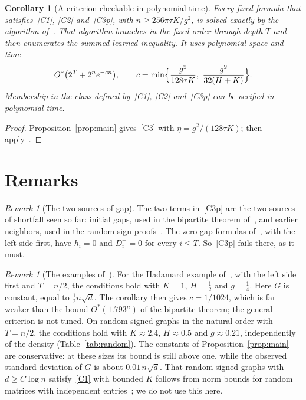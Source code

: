 \documentclass[11pt,a4paper]{article}
\newtheorem{corollary}[theorem]{Corollary}
\theoremstyle{remark}
\newtheorem{remark}[theorem]{Remark}
\newcommand{\Ostar}{O^{*}}
\begin{document}
\begin{corollary}[A criterion checkable in polynomial time]\label{cor:main}
Every fixed formula that satisfies~\eqref{C1}, \eqref{C2} and~\eqref{C3p}, with
$n\ge256\pi\tau K/g^2$, is solved exactly by the algorithm
of~\cite[Theorem~2]{CC}. That algorithm branches in the fixed order through
depth $T$ and then enumerates the summed learned inequality. It uses
polynomial space and time
\[
 \Ostar\bigl(2^T+2^ne^{-cn}\bigr),\qquad
 c=\min\Bigl\{\frac{g^2}{128\tau K},\ \frac{g^2}{32(H+K)}\Bigr\}.
\]
Membership in the class defined by~\eqref{C1}, \eqref{C2} and~\eqref{C3p} can
be verified in polynomial time.
\end{corollary}

\begin{proof}
Proposition~\ref{prop:main} gives~\eqref{C3} with $\eta=g^2/(128\tau K)$;
then apply~\cite[Theorem~2]{CC}.
\end{proof}

\section{Remarks}

\begin{remark}[The two sources of gap]
The two terms in~\eqref{C3p} are the two sources of shortfall seen so far:
initial gaps, used in the bipartite theorem of~\cite{CC}, and earlier
neighbors, used in the random-sign proofs~\cite{EE}. The zero-gap formulas
of~\cite[Section~6]{CC}, with the left side first, have $h_i=0$ and $D_i^-=0$
for every $i\le T$. So~\eqref{C3p} fails there, as it must.
\end{remark}

\begin{remark}[The examples of~\cite{CC}]
For the Hadamard example of~\cite[Section~5]{CC}, with the left side first
and $T=n/2$, the conditions hold with $K=1$, $H=\frac12$ and $g=\frac14$. Here
$G$ is constant, equal to $\frac12n\sqrt d$. The corollary then gives
$c=1/1024$, which is far weaker than the bound $\Ostar(1.793^n)$ of the
bipartite theorem; the general criterion is not tuned. On random signed graphs
in the natural order with $T=n/2$, the conditions hold with $K\approx2.4$,
$H\approx0.5$ and $g\approx0.21$, independently of the density
(Table~\ref{tab:random}). The constants of Proposition~\ref{prop:main} are
conservative: at these sizes its bound is still above one, while the observed
standard deviation of $G$ is about $0.01\,n\sqrt d$. That random signed graphs
with $d\ge C\log n$ satisfy~\eqref{C1} with bounded $K$ follows from norm
bounds for random matrices with independent entries~\cite{BvH16}; we do not
use this here.
\end{remark}
\end{document}
